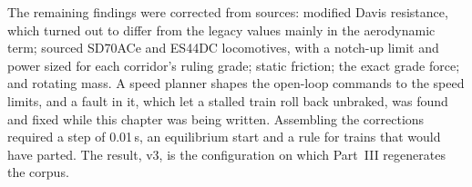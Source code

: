 The remaining findings were corrected from sources: modified Davis resistance, which turned out to differ from the legacy values mainly in the aerodynamic term; sourced SD70ACe and ES44DC locomotives, with a notch-up limit and power sized for each corridor's ruling grade; static friction; the exact grade force; and rotating mass. A speed planner shapes the open-loop commands to the speed limits, and a fault in it, which let a stalled train roll back unbraked, was found and fixed while this chapter was being written. Assembling the corrections required a step of 0.01\,s, an equilibrium start and a rule for trains that would have parted. The result, v3, is the configuration on which Part~III regenerates the corpus.

